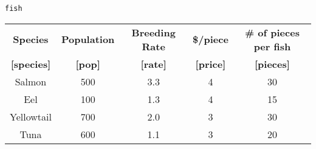 \begin{center}
\lstinline{fish}

\begin{tabular}{|c|c|c|c|c|}
 \hline
 \textbf{Species} & \textbf{Population} & \textbf{Breeding Rate} & \textbf{\$/piece} & \textbf{\# of pieces per fish} \\
  \textbf{[species]} & \textbf{[pop]} & \textbf{[rate]} & \textbf{[price]} & \textbf{[pieces]} \\
 \hline
 Salmon & 500 & 3.3 & 4 & 30 \\
 \hline
 Eel & 100 & 1.3 & 4 & 15 \\
 \hline
  Yellowtail & 700 & 2.0 & 3 & 30 \\
 \hline
 Tuna & 600 & 1.1 & 3 & 20 \\
 \hline
\end{tabular}
\end{center}
